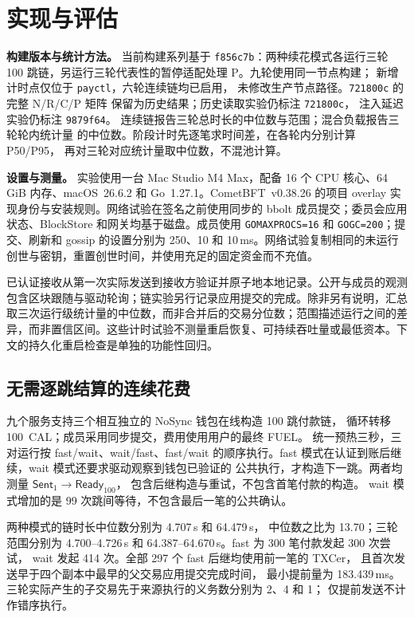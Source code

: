 \section{实现与评估}
\label{sec:evaluation}
\noindent\textbf{构建版本与统计方法。}
当前构建系列基于 \texttt{f856c7b}：两种续花模式各运行三轮
100 跳链，另运行三轮代表性的暂停适配处理 P。九轮使用同一节点构建；
新增计时点仅位于 \texttt{payctl}，六轮连续链均已启用，
未修改生产节点路径。\texttt{721800c} 的完整 N/R/C/P 矩阵
保留为历史结果；历史读取实验仍标注 \texttt{721800c}，
注入延迟实验仍标注 \texttt{9879f64}。
连续链报告三轮总时长的中位数与范围；混合负载报告三轮轮内统计量
的中位数。阶段计时先逐笔求时间差，在各轮内分别计算 P50/P95，
再对三轮对应统计量取中位数，不混池计算。

\noindent\textbf{设置与测量。}
实验使用一台 Mac Studio M4 Max，配备 16 个 CPU 核心、64\,GiB 内存、macOS~26.6.2 和 Go~1.27.1。CometBFT~v0.38.26 的项目 overlay 实现身份与安装规则。网络试验在签名之前使用同步的 bbolt 成员提交；委员会应用状态、BlockStore 和网关均基于磁盘。成员使用 \texttt{GOMAXPROCS=16} 和 \texttt{GOGC=200}；提交、刷新和 gossip 的设置分别为 250、10 和 10\,ms。网络试验复制相同的未运行创世与密钥，重置创世时间，并使用充足的固定资金而不充值。

已认证接收从第一次实际发送到接收方验证并原子地本地记录。公开与成员的观测包含区块跟随与驱动轮询；链实验另行记录应用提交的完成。除非另有说明，汇总取三次运行级统计量的中位数，而非合并后的交易分位数；范围描述运行之间的差异，而非置信区间。这些计时试验不测量重启恢复、可持续吞吐量或最低资本。下文的持久化重启检查是单独的功能性回归。

\subsection{无需逐跳结算的连续花费}
\label{sec:eval-continuation}


九个服务支持三个相互独立的 NoSync 钱包在线构造 100 跳付款链，
循环转移 100~CAL；成员采用同步提交，费用使用用户的最终 FUEL。
统一预热三秒，三对运行按 fast/wait、wait/fast、fast/wait 的顺序执行。fast 模式在认证到账后继续，wait 模式还要求驱动观察到钱包已验证的
公共执行，才构造下一跳。两者均测量
$\mathsf{Sent}_1 \rightarrow \mathsf{Ready}_{100}$，
包含后继构造与重试，不包含首笔付款的构造。
wait 模式增加的是 99 次跳间等待，不包含最后一笔的公共确认。

两种模式的链时长中位数分别为 4.707\,s 和 64.479\,s，
中位数之比为 13.70；三轮范围分别为 4.700--4.726\,s
和 64.387--64.670\,s。fast 为 300 笔付款发起 300 次尝试，
wait 发起 414 次。全部 297 个 fast 后继均使用前一笔的 TXCer，
且首次发送早于四个副本中最早的父交易应用提交完成时间，
最小提前量为 183.439\,ms。
三轮实际产生的子交易先于来源执行的义务数分别为 2、4 和 1；
仅提前发送不计作错序执行。

